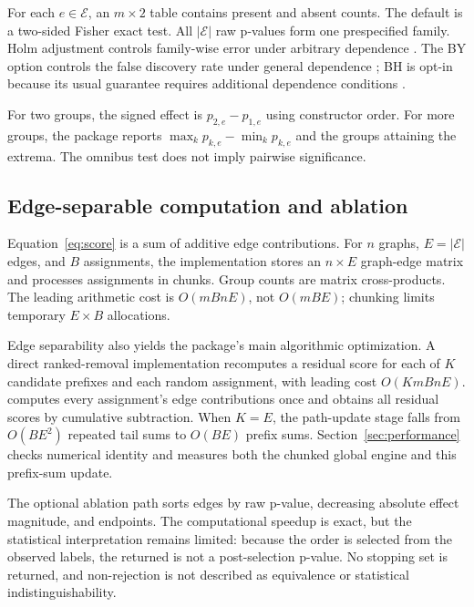 \documentclass[article]{jss}\usepackage[]{graphicx}\usepackage[]{xcolor}
\begin{document}
For each $e\in\mathcal E$, an $m\times2$ table contains present and absent
counts. The default is a two-sided Fisher exact test. All $|\mathcal E|$
raw p-values form one prespecified family. Holm adjustment controls family-wise
error under arbitrary dependence \citep{Holm1979}. The BY option controls the
false discovery rate under general dependence \citep{BenjaminiYekutieli2001};
BH is opt-in because its usual guarantee requires additional dependence
conditions \citep{BenjaminiHochberg1995}.

For two groups, the signed effect is $p_{2,e}-p_{1,e}$ using constructor order.
For more groups, the package reports $\max_kp_{k,e}-\min_kp_{k,e}$ and the
groups attaining the extrema. The omnibus test does not imply pairwise
significance.

\subsection{Edge-separable computation and ablation}

Equation~\ref{eq:score} is a sum of additive edge contributions. For $n$
graphs, $E=|\mathcal E|$ edges, and $B$ assignments, the implementation stores
an $n\times E$ graph-edge matrix and processes assignments in chunks. Group
counts are matrix cross-products. The leading arithmetic cost is
$O(mBnE)$, not $O(mBE)$; chunking limits temporary $E\times B$ allocations.

Edge separability also yields the package's main algorithmic optimization.
A direct ranked-removal implementation recomputes a residual score for each
of $K$ candidate prefixes and each random assignment, with leading cost
$O(KmBnE)$.  computes every assignment's edge
contributions once and obtains all residual scores by cumulative subtraction.
When $K=E$, the path-update stage falls from $O(BE^2)$ repeated tail sums to
$O(BE)$ prefix sums. Section~\ref{sec:performance} checks numerical identity
and measures both the chunked global engine and this prefix-sum update.

The optional ablation path sorts edges by raw p-value, decreasing absolute
effect magnitude, and endpoints. The computational speedup is exact, but the
statistical interpretation remains limited: because the order is selected
from the observed labels, the returned
 is not a post-selection p-value. No stopping
set is returned, and non-rejection is not described as equivalence or
statistical indistinguishability.
\end{document}
